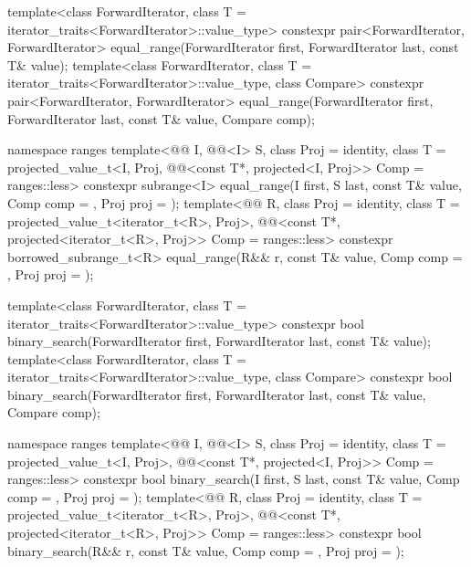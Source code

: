 \begin{codeblock}
{  template<class ForwardIterator, class T = iterator_traits<ForwardIterator>::value_type>
    constexpr pair<ForwardIterator, ForwardIterator>
      equal_range(ForwardIterator first, ForwardIterator last,
                  const T& value);
  template<class ForwardIterator, class T = iterator_traits<ForwardIterator>::value_type,
           class Compare>
    constexpr pair<ForwardIterator, ForwardIterator>
      equal_range(ForwardIterator first, ForwardIterator last,
                  const T& value, Compare comp);

  namespace ranges {
    template<@@ I, @@<I> S, class Proj = identity,
             class T = projected_value_t<I, Proj,
             @@<const T*, projected<I, Proj>> Comp = ranges::less>
      constexpr subrange<I>
        equal_range(I first, S last, const T& value, Comp comp = {}, Proj proj = {});
    template<@@ R, class Proj = identity,
             class T = projected_value_t<iterator_t<R>, Proj>,
             @@<const T*, projected<iterator_t<R>, Proj>> Comp =
               ranges::less>
      constexpr borrowed_subrange_t<R>
        equal_range(R&& r, const T& value, Comp comp = {}, Proj proj = {});
  }

  template<class ForwardIterator, class T = iterator_traits<ForwardIterator>::value_type>
    constexpr bool
      binary_search(ForwardIterator first, ForwardIterator last,
                    const T& value);
  template<class ForwardIterator, class T = iterator_traits<ForwardIterator>::value_type,
           class Compare>
    constexpr bool
      binary_search(ForwardIterator first, ForwardIterator last,
                    const T& value, Compare comp);

  namespace ranges {
    template<@@ I, @@<I> S, class Proj = identity,
             class T = projected_value_t<I, Proj>,
             @@<const T*, projected<I, Proj>> Comp = ranges::less>
      constexpr bool binary_search(I first, S last, const T& value, Comp comp = {},
                                   Proj proj = {});
    template<@@ R, class Proj = identity,
             class T = projected_value_t<iterator_t<R>, Proj>,
             @@<const T*, projected<iterator_t<R>, Proj>> Comp =
               ranges::less>
      constexpr bool binary_search(R&& r, const T& value, Comp comp = {},
                                   Proj proj = {});
  }

}
\end{codeblock}

